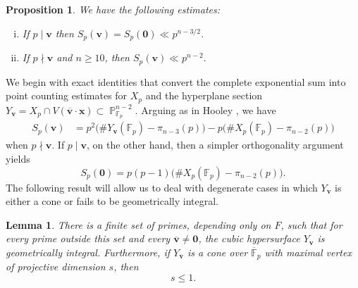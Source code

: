 \documentclass[a4paper,11pt, twoside,reqno]{amsart}
\theoremstyle{plain}
\newtheorem{lemma}[thm]{Lemma}
\newtheorem{prop}[thm]{Proposition}
\theoremstyle{definition}
\theoremstyle{remark}
\newcommand{\bfv}{\bm{v}}
\newcommand{\bfx}{\bm{x}}
\DeclareMathOperator{\PP}{\mathbb{P}}
\renewcommand{\bar}{\overline}
\renewcommand{\leq}{\leqslant}
\renewcommand{\geq}{\geqslant}
\newcommand{\FF}{\mathbb{F}}
\numberwithin{equation}{section}
\begin{document}
\begin{prop}
\label{prop:prime-modulus-pointwise}
We have the following estimates:
\begin{enumerate}[(i)]
\item If $p\mid\bfv$ then
$        S_p(\bfv)=S_p(\bm 0)\ll p^{n-3/2}$.

\item If $p\nmid\bfv$ and $n\geq 10$, then
$
S_p(\bfv)\ll p^{n-2}.
$
\end{enumerate}
\end{prop}

We begin with exact identities that convert the complete exponential sum into
point counting estimates  for $X_p$ and the hyperplane section  
$Y_{\bfv}=X_p\cap V(\bar{\bfv}\cdot\bfx)   \subset\PP^{n-2}_{\FF_p}$.
 Arguing as in Hooley \cite[Eq.~(47)]{hooley-w}, 
we have 
\begin{align}
    S_p(\bfv)
    &=p^2\bigl(\#Y_{\bfv}(\FF_p)-\pi_{n-3}(p)\bigr)
      -p\bigl(\#X_p(\FF_p)-\pi_{n-2}(p)\bigr)
    \label{eq:Sp-projective-v-nonzero}
\end{align}
when $p\nmid \bm{v}$. If $p\mid \bm{v}$, on the other hand, then a simpler orthogonality argument yields
\begin{equation}
    S_p(\bm 0)
    =p(p-1)\bigl(\#X_p(\FF_p)-\pi_{n-2}(p)\bigr).
    \label{eq:Sp-projective-v-zero}
\end{equation}
The following result will allow us to deal with degenerate cases in which $Y_{\bm{v}}$ is either a cone or fails to be geometrically integral.


\begin{lemma}
\label{lem:geometry-all-hyperplane-sections}
There is a finite set of primes, depending only on $F$, such that for every
prime outside this set and every $\bar{\bfv}\neq\bm 0$, the cubic hypersurface
$Y_{\bfv}$
is geometrically integral.  Furthermore, if $Y_{\bfv}$ is a cone over $\bar{\FF}_p$ with maximal vertex of 
projective dimension $s$, then
\begin{equation}
s\leq 1.
\label{eq:prime-sum-vertex-bound}
\end{equation}
\end{lemma}
\end{document}
